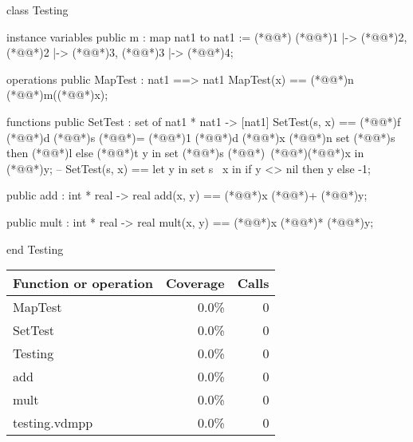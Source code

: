 \documentclass[a4paper]{article}
\begin{document}
\title{}
\author{}
\begin{vdm_al}
class Testing

instance variables
    public m : map nat1 to nat1 := (*@\vdmnotcovered{}@*){ (*@\vdmnotcovered{}@*)1 |-> (*@\vdmnotcovered{}@*)2, (*@\vdmnotcovered{}@*)2 |-> (*@\vdmnotcovered{}@*)3, (*@\vdmnotcovered{}@*)3 |-> (*@\vdmnotcovered{}@*)4};

operations
    public MapTest : nat1 ==> nat1
    MapTest(x) == (*@@*)n (*@\vdmnotcovered{}@*)m((*@\vdmnotcovered{}@*)x);

functions
    public SetTest : set of nat1 * nat1 -> [nat1]
    SetTest(s, x) == (*@@*)f (*@@*)d (*@\vdmnotcovered{}@*)s (*@\vdmnotcovered{}@*)= (*@\vdmnotcovered{}@*)1 (*@@*)d (*@\vdmnotcovered{}@*)x (*@@*)n set (*@\vdmnotcovered{}@*)s then (*@@*)l else (*@@*)t y in set (*@\vdmnotcovered{}@*)s (*@\vdmnotcovered{}@*)\ (*@\vdmnotcovered{}@*){(*@\vdmnotcovered{}@*)x} in (*@\vdmnotcovered{}@*)y;
    -- SetTest(s, x) == let y in set s \ {x} in if y <> nil then y else -1;

    public add : int * real -> real
    add(x, y) == (*@\vdmnotcovered{}@*)x (*@\vdmnotcovered{}@*)+ (*@\vdmnotcovered{}@*)y;

    public mult : int * real -> real
    mult(x, y) == (*@\vdmnotcovered{}@*)x (*@\vdmnotcovered{}@*)* (*@\vdmnotcovered{}@*)y;

end Testing 
\end{vdm_al}
\bigskip
\begin{longtable}{|l|r|r|}
\hline
Function or operation & Coverage & Calls \\
\hline
\hline
MapTest & 0.0\% & 0 \\
\hline
SetTest & 0.0\% & 0 \\
\hline
Testing & 0.0\% & 0 \\
\hline
add & 0.0\% & 0 \\
\hline
mult & 0.0\% & 0 \\
\hline
\hline
testing.vdmpp & 0.0\% & 0 \\
\hline
\end{longtable}
\end{document}
